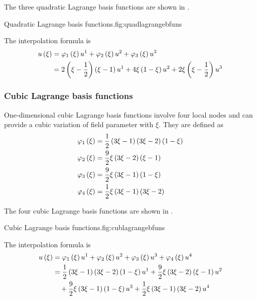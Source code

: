 The three \onedal quadratic Lagrange basis functions are shown in .

{Quadratic Lagrange basis functions.}{fig:quadlagrangebfuns}

The interpolation formula is
\begin{equation}
  \begin{split}
     u\left( \xi \right) &=   \varphi_{1} \left( \xi \right)   {u}^{1} +   \varphi_{2} \left( \xi \right)   {u}^{2} +
       \varphi_{3} \left( \xi \right)   {u}^{3} \\
    &=2\left( \xi-\frac12 \right)\left( \xi-1 \right) {u}^{1} +
    4\xi\left( 1-\xi \right) {u}^{2} +2\xi\left( \xi-\frac12 \right) {u}^{3} 
  \end{split}
\end{equation}

\subsubsection{Cubic Lagrange basis functions}

One-dimensional cubic Lagrange basis functions involve
four local nodes and can provide a cubic variation of field parameter
with $\xi$. They are defined as
\begin{equation}
  \begin{split}
    \lbfn{1}{\xi}&=\frac12\pbrac{3\xi-1}\pbrac{3\xi-2}\pbrac{1-\xi} \\
    \lbfn{2}{\xi}&=\frac92\xi\pbrac{3\xi-2}\pbrac{\xi-1} \\
    \lbfn{3}{\xi}&=\frac92\xi\pbrac{3\xi-1}\pbrac{1-\xi} \\
    \lbfn{4}{\xi}&=\frac12\xi\pbrac{3\xi-1}\pbrac{3\xi-2}
  \end{split}
  \label{eqn:cubiclbfuns}
\end{equation}

The four \onedal cubic Lagrange basis functions are shown in .

{Cubic Lagrange basis functions.}{fig:cublagrangebfuns}

The interpolation formula is
\begin{equation}
  \begin{split}
     u\left( \xi \right) &=   \varphi_{1} \left( \xi \right)   {u}^{1} +   \varphi_{2} \left( \xi \right)   {u}^{2} +
       \varphi_{3} \left( \xi \right)   {u}^{3} +   \varphi_{4} \left( \xi \right)   {u}^{4} \\
    &=\frac12\left( 3\xi-1 \right)\left( 3\xi-2 \right)\left( 1-\xi \right) {u}^{1} +
    \frac92\xi\left( 3\xi-2 \right)\left( \xi-1 \right) {u}^{2}  \\
    &\quad+\frac92\xi\left( 3\xi-1 \right)\left( 1-\xi \right) {u}^{3} +
    \frac12\xi\left( 3\xi-1 \right)\left( 3\xi-2 \right) {u}^{4} 
  \end{split}
\end{equation}

